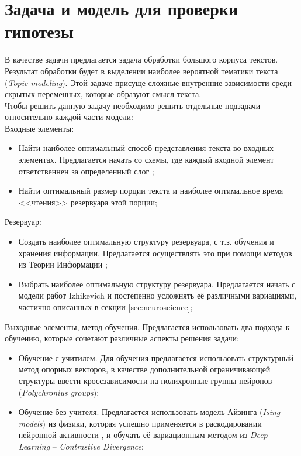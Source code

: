 \documentclass[a4paper,10pt]{article}
\begin{document}
\section{Задача и модель для проверки гипотезы}
В качестве задачи предлагается задача обработки большого корпуса текстов. Результат обработки будет в выделении наиболее вероятной тематики текста (\textit{Topic modeling}). Этой задаче присуще сложные внутренние зависимости среди скрытых переменных, которые образуют смысл текста.\\
\indent Чтобы решить данную задачу необходимо решить отдельные подзадачи относительно каждой части модели:\\
Входные элементы:
\begin{itemize}
\item Найти наиболее оптимальный способ представления текста во входных элементах. Предлагается начать со схемы, где каждый входной элемент ответственнен за определенный слог \cite{rnn_text};  
\item Найти оптимальный размер порции текста и наиболее оптимальное время <<чтения>> резервуара этой порции;
\end{itemize} 
Резервуар:
\begin{itemize}
\item Создать наиболее оптимальную структуру резервуара, с т.з. обучения и хранения информации. Предлагается осуществлять это при помощи методов из Теории Информации \cite{inf_th}; 
\item Выбрать наиболее оптимальную структуру резервуара. Предлагается начать с модели работ Izhikevich \cite{izh_groups} и постепенно усложнять её различными вариациями, частично описанных в секции \ref{sec:neuroscience};
\end{itemize}
Выходные элементы, метод обучения. Предлагается использовать два подхода к обучению, которые сочетают различные аспекты решения задачи:
\begin{itemize}
\item Обучение с учитилем. Для обучения предлагается использовать структурный метод опорных векторов, в качестве дополнительной ограничивающей структуры ввести кроссзависимости на полихронные группы нейронов (\textit{Polychronius groups});
\item Обучение без учителя. Предлагается использовать модель Айзинга (\textit{Ising models}) из физики, которая успешно применяется в раскодировании нейронной активности \cite{schneidman0}\cite{schneidman1}, и обучать её вариационным методом из \textit{Deep Learning} -- \textit{Contrastive Divergence}\cite{hinton2006};
\end{itemize} 
\end{document}
